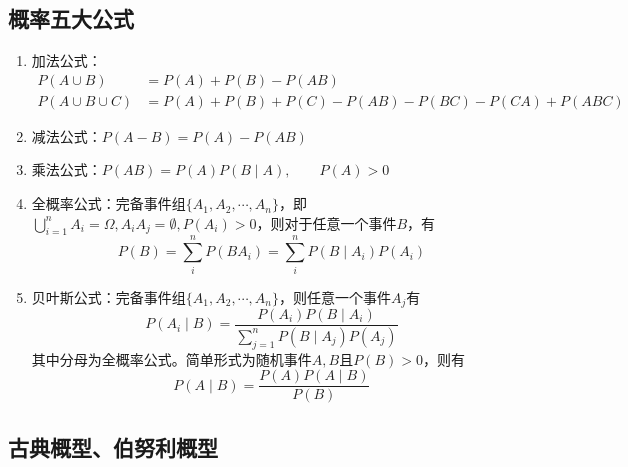 \subsection{概率五大公式}
\begin{enumerate}[(1)]
    \item 加法公式：
          \begin{align*}
              P(A\cup B)       & = P(A)+P(B)-P(AB)                         \\
              P(A\cup B\cup C) & = P(A)+P(B)+P(C)-P(AB)-P(BC)-P(CA)+P(ABC)
          \end{align*}
    \item 减法公式：$ P(A-B)=P(A)-P(AB) $
    \item 乘法公式：$ P(AB) = P(A)P(B\mid A),\qquad P(A)>0  $
    \item 全概率公式：完备事件组$\{A_1,A_2,\cdots,A_n \}$，即$\bigcup_{i=1}^n A_i = \Omega, A_iA_j = \emptyset, P(A_i)>0$，则对于任意一个事件$B$，有
          \[ P(B) = \sum_i^n P(BA_i) = \sum_i^n P(B\mid A_i)P(A_i) \]
    \item 贝叶斯公式：完备事件组$\{A_1,A_2,\cdots,A_n \}$，则任意一个事件$A_j$有
          \[ P(A_i\mid B) = \frac{P(A_i)P(B\mid A_i)}{\sum_{j=1}^n P(B\mid A_j)P(A_j)} \]
          其中分母为全概率公式。简单形式为随机事件$A,B$且$P(B)>0$，则有
          \[ P(A\mid B) = \frac{P(A)P(A\mid B)}{P(B)} \]
\end{enumerate}

\subsection{古典概型、伯努利概型}